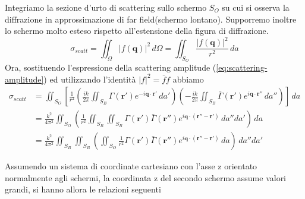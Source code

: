 \begin{fullwidth}
    Integriamo la sezione d'urto di scattering sullo schermo $ S_O$ su cui si osserva la diffrazione in approssimazione di
    far field(schermo lontano).
    Supporremo inoltre lo schermo molto esteso rispetto all'estensione della figura di diffrazione.
    \[
        \sigma_{scatt} = \iint_{\Omega} |f(\bm{q})|^2 \, d \Omega = \iint_{S_O} \frac{|f(\bm{q})|^2}{r^2} \, da
    \]
    Ora, sostituendo l'espressione della scattering amplitude (\ref{eq:scattering-amplitude}) ed utilizzando l'identità
    $ |f|^2 = \bar{f}f$ abbiamo
    \begin{align*}
        \sigma_{scatt} &= \iint_{S_O} \left[
            \frac{1}{{r}^{2}} \left(
            \frac{ik}{2 \pi} \iint_{S_B} \Gamma(\bm{r}')
            e^{-i \bm{q} \cdot \bm{r}'} \, da'
            \right)
            \left( - \frac{ik}{2 \pi} \iint_{S_B} \bar{\Gamma}(\bm{r}') e^{i \bm{q} \cdot \bm{r}''} \, da'' \right)
            \right] \,  da \\
        & =  \frac{{k}^{2}}{4 \pi^2} \iint_{S_O} \left( \frac{1}{{r}^{2}} \iint_{S_B}  \iint_{S_B}
        \Gamma(\bm{r}') \bar{\Gamma}(\bm{r}'') e^{i \bm{q} \cdot (\bm{r}''-\bm{r}')} \, da'' da' \right) \, da \\
        & = \frac{{k}^{2}}{4 \pi^2}  \iint_{S_B}  \iint_{S_B}\left(\iint_{S_O} \frac{1}{{r}^{2}}
        \Gamma(\bm{r}') \bar{\Gamma}(\bm{r}'') e^{i \bm{q} \cdot (\bm{r}''-\bm{r}')} \, da \right) \, da'' da'
    \end{align*}

    Assumendo un sistema di coordinate cartesiano con l’asse z orientato normalmente agli schermi, la coordinata z
    del secondo schermo assume valori grandi, si hanno allora le relazioni seguenti







\end{fullwidth}
